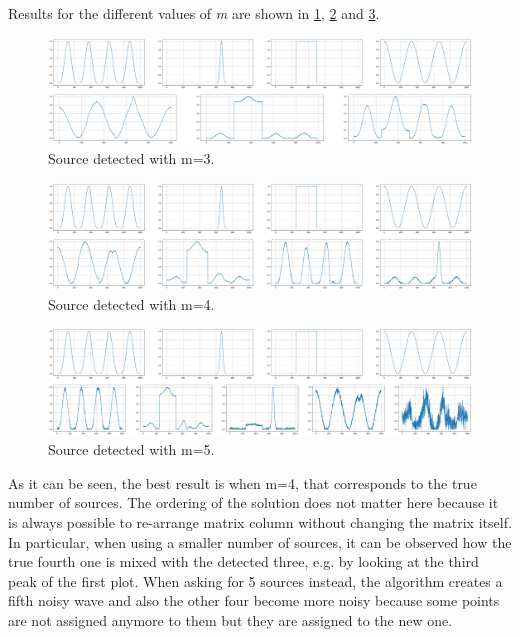 \documentclass[a4paper,10pt]{report}
\begin{document}
Results for the different values of \emph{m} are shown in \ref{fig:m_3}, \ref{fig:m_4} and \ref{fig:m_5}.
\begin{figure}[h]
    \center
    \includegraphics[width=1\linewidth]{nmf_3.png}
    \caption{Source detected with m=3.}
    \label{fig:m_3}
  \end{figure}
  \begin{figure}[h]
    \center
    \includegraphics[width=1\linewidth]{nmf_4.png}
    \caption{Source detected with m=4.}
    \label{fig:m_4}
  \end{figure}
  \begin{figure}[h]
    \center
    \includegraphics[width=1\linewidth]{nmf_5.png}
    \caption{Source detected with m=5.}
    \label{fig:m_5}
  \end{figure}

As it can be seen, the best result is when m=4, that corresponds to the true number of sources. The ordering of the solution does not matter here because it is always possible to re-arrange matrix column without changing the matrix itself.
In particular, when using a smaller number of sources, it can be observed how the true fourth one is mixed with the detected three, e.g. by looking at the third peak of the first plot.
When asking for 5 sources instead, the algorithm creates a fifth noisy wave and also the other four become more noisy because some points are not assigned anymore to them but they are assigned to the new one.
\end{document}
